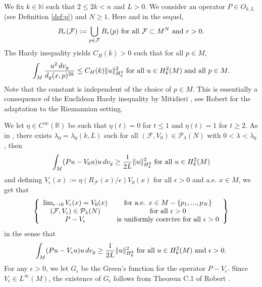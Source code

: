 \documentclass[reqno]{amsart}
\def \rr {\mathbb{R}}
\def \nn {\mathbb{N}}
\def \eps {\epsilon}
\def \Pl {{\mathcal P}_\lambda}
\def \Mmx {M - \{p_1,...,p_N\}}
\def \F {{\mathcal F}}
\begin{document}
We fix $k\in\nn$ such that $2\leq 2k<n$ and $L>0$. We consider an operator $P\in O_{k,L}$ (see Definition \ref{def:p}) and $N\geq 1$. Here and in the sequel,
\begin{equation*}
 B_{r}(\F):=\bigcup_{p\in\F} B_{r}(p)\hbox{ for all }\F\subset M^N\hbox{ and }r>0.
 \end{equation*}
The Hardy inequality yields $C_H(k)>0$  such that for all $p\in M$,
\begin{equation*}
\int_M\frac{u^2\, dv_g}{d_g(x,p)^{2k}} \leq C_H(k)\Vert u\Vert_{H_k^2}^2\hbox{ for all }u\in H_k^2(M)\hbox{ and all }p\in M.
\end{equation*}
Note that the constant is independent of the choice of $p\in M$. This is essentially a consequence of the Euclidean Hardy inequality by Mitidieri \cite{mitidieri}, see Robert \cite{robert:gjms} for the adaptation to the Riemannian setting. 


\smallskip\noindent We  let $\eta\in C^\infty(\rr)$ be such that $\eta(t)=0$ for $t\leq 1$ and $\eta(t)=1$ for $t\geq 2$. As in \cite{robert:gjms}, there exists $\lambda_0=\lambda_0(k, L)$ such for all $(\F,V_0)\in \Pl(N) $ with $0<\lambda<\lambda_0$, then 
\begin{equation*}
\int_M (Pu-V_0 u)u\, dv_g\geq \frac{1}{2L}\Vert u\Vert_{H_k^2}^2\hbox{ for all }u\in H_k^2(M)
\end{equation*}
and defining $V_\eps(x):=\eta(R_\F(x)/\eps) V_0(x)$ for all $\eps>0$ and a.e. $x\in M$, we get that
\begin{equation}\label{hyp:Ve}
\left\{\begin{array}{cc}
\lim_{\eps\to 0}V_\eps(x)=V_0(x)&\hbox{ for a.e. }x\in \Mmx\\
(\F,V_\eps)\in \Pl(N)&\hbox{ for all }\eps>0\\
P-V_\eps&\hbox{ is uniformly coercive for all }\eps>0
\end{array}\right\}
\end{equation}
in the sense that
\begin{equation}\label{coer:PV}
\int_M (Pu-V_\eps u)u\, dv_g\geq \frac{1}{2L}\Vert u\Vert_{H_k^2}^2\hbox{ for all }u\in H_k^2(M)\hbox{ and }\eps>0.
\end{equation}
For any $\eps>0$,  we let $G_\eps$ be the Green's function for the operator $P-V_\eps$. Since $V_\eps\in L^\infty(M)$, the existence of $G_\eps$ follows from Theorem C.1 of Robert \cite{robert:gjms}.
\end{document}
